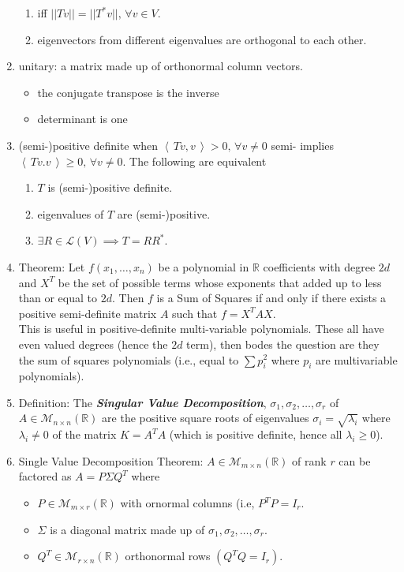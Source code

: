 \documentclass[11pt]{amsart}
\theoremstyle{definition}  %
\newcommand{\R}{\mathbb{R}}
\newcommand{\IP}[1]{\left \langle\, #1 \,\right \rangle}
\newcommand{\LL}{\mathcal{L}}
\newcommand{\MM}{\mathcal{M}}
\begin{document}
\begin{enumerate}
\begin{enumerate}[label=\alph*)]
		\item iff $||Tv||=||T^*v||,\, \forall v \in V$.
		\item eigenvectors from different eigenvalues are orthogonal to each other.
	\end{enumerate}
	\item unitary: a matrix made up of orthonormal column vectors.
	\begin{itemize}
		\item the conjugate transpose is the inverse
		\item determinant is one
	\end{itemize}
	\item (semi-)positive definite when $\IP{Tv,v} > 0,\,\forall v\ne 0$ semi- implies $\IP{Tv.v} \ge 0,\,\forall v\ne 0$.  The following are equivalent
	\begin{enumerate}[label=\roman*)]
		\item $T$ is (semi-)positive definite.
		\item eigenvalues of $T$ are (semi-)positive.
		\item $\exists R \in \LL(V) \implies T=RR^*$.
	\end{enumerate}
	\item Theorem: Let $f(x_1,\dots,x_n)$ be a polynomial in $\R$ coefficients with degree $2d$ and $X^T$ be the set of possible terms whose exponents that added up to less than or equal to $2d$.  Then $f$ is a Sum of Squares if and only if there exists a positive semi-definite matrix $A$ such that $f=X^TAX$.\\
	
	This is useful in positive-definite multi-variable polynomials.  These all have even valued degrees (hence the $2d$ term), then bodes the question are they the sum of squares polynomials (i.e., equal to $\sum p_i^2$ where $p_i$ are multivariable polynomials).\\
	
	\item Definition: The \textbf{\textit{Singular Value Decomposition}}, $\sigma_1, \sigma_2,\dots, \sigma_r$ of $A \in \MM_{n\times n}(\R)$ are the positive square roots of eigenvalues $\sigma_i = \sqrt{\lambda_i}$ where $\lambda_i \ne 0$ of the matrix $K = A^TA$ (which is positive definite, hence all $\lambda_i\ge 0$).
	\item Single Value Decomposition Theorem: $A \in \MM_{m\times n}(\R)$ of rank $r$ can be factored as $A=P\Sigma Q^T$ where 
	\begin{itemize}
		\item $P \in \MM_{m\times r}(\R)$ with ornormal columns (i.e, $P^TP=I_r$.
		\item $\Sigma$ is a diagonal matrix made up of $\sigma_1, \sigma_2, \dots, \sigma_r$.
		\item $Q^T \in \MM_{r\times n}(\R)$ orthonormal rows $(Q^TQ=I_r)$.\\
	\end{itemize}
	

\end{enumerate}
\end{document}
